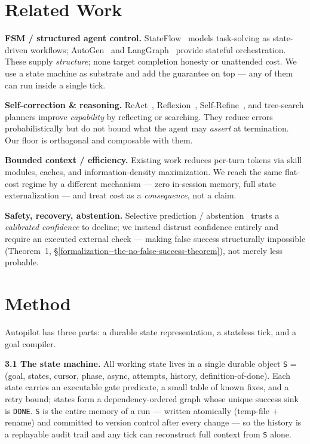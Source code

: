 \section{Related Work}\label{related-work}

\textbf{FSM / structured agent control.} StateFlow~\citep{wu2024stateflow} models task-solving as state-driven
workflows; AutoGen~\citep{wu2023autogen} and LangGraph~\citep{langgraph2024} provide stateful orchestration.
These supply \emph{structure}; none target completion honesty or
unattended cost. We use a state machine as substrate and add the guarantee on top --- any of them can run
inside a single tick.

\textbf{Self-correction \& reasoning.} ReAct~\citep{yao2023react}, Reflexion~\citep{shinn2023reflexion},
Self-Refine~\citep{madaan2023selfrefine}, and tree-search planners improve
\emph{capability} by reflecting or searching. They reduce errors probabilistically but do not bound what the
agent may \emph{assert} at termination. Our floor is orthogonal and composable with them.

\textbf{Bounded context / efficiency.} Existing work reduces per-turn tokens via skill modules, caches, and
information-density maximization. We reach the same flat-cost regime by a different mechanism --- zero
in-session memory, full state externalization --- and treat cost as a \emph{consequence}, not a claim.

\textbf{Safety, recovery, abstention.} Selective
prediction / abstention~\citep{geifman2017selective} trusts a \emph{calibrated confidence} to decline; we
instead distrust confidence entirely and require an executed external check --- making false success
structurally impossible (Theorem~1, \S\ref{formalization--the-no-false-success-theorem}), not merely less probable.



\section{Method}\label{method}

Autopilot has three parts: a durable state representation, a stateless tick, and a goal compiler.

\textbf{3.1 The state machine.} All working state lives in a single durable object \texttt{S} =
(goal, states, cursor, phase, async, attempts, history, definition-of-done). Each state carries an executable gate
predicate, a small table of known fixes, and a retry bound; states form a dependency-ordered graph
whose unique success sink is \texttt{DONE}. \texttt{S} is the entire memory of a run --- written atomically
(temp-file + rename) and committed to version control after every change --- so the history is a
replayable audit trail and any tick can reconstruct full context from \texttt{S} alone.


